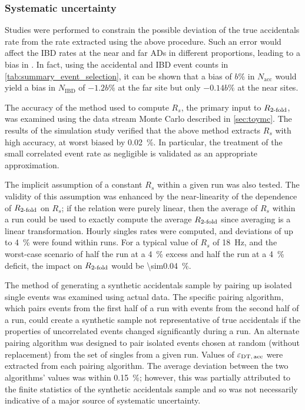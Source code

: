 \subsubsection{Systematic uncertainty}

Studies were performed to constrain the possible deviation
of the true accidentals rate
from the rate extracted using the above procedure.
Such an error would affect the IBD rates at the near and far ADs in different proportions,
leading to a bias in \thetaot{}.
In fact, using the accidental and IBD event counts in \cref{tab:summary_event_selection},
it can be shown that a bias of $b\si{\percent}$ in $N_{\text{acc}}$
would yield a bias in $N_{\text{IBD}}$ of $-1.2b\si{\percent}$ at the far site
but only $-0.14b\si{\percent}$ at the near sites.

The accuracy of the method used to compute $R_{s}$,
the primary input to $R_{\text{\ensuremath{2}-fold}}$,
was examined using the data stream Monte Carlo described in \cref{sec:toymc}.
The results of the simulation study verified that
the above method extracts $R_s$ with high accuracy, at worst biased by \SI{0.02}{\percent}.
In particular, the treatment of the small correlated event rate as negligible
is validated as an appropriate approximation.

The implicit assumption of a constant $R_s$ within a given run was also tested.
The validity of this assumption was enhanced by the near-linearity of
the dependence of $R_{\text{\ensuremath{2}-fold}}$ on $R_s$;
if the relation were purely linear,
then the average of $R_s$ within a run could be used to exactly compute
the average $R_{\text{\ensuremath{2}-fold}}$ since averaging is a linear transformation.
Hourly singles rates were computed, and deviations of up to \SI{4}{\percent}
were found within runs.
For a typical value of $R_s$ of \SI{18}{\Hz},
and the worst-case scenario of half the run at a \SI{4}{\percent} excess
and half the run at a \SI{4}{\percent} deficit,
the impact on $R_{\text{\ensuremath{2}-fold}}$ would be \SI{\sim0.04}{\percent}.

The method of generating a synthetic accidentals sample
by pairing up isolated single events was examined using actual data.
The specific pairing algorithm, which pairs events from the first half of a run
with events from the second half of a run,
could create a synthetic sample not representative of true accidentals
if the properties of uncorrelated events changed significantly during a run.
An alternate pairing algorithm was designed to pair isolated events
chosen at random (without replacement) from the set of singles from a given run.
Values of $\varepsilon_{\text{DT,\,acc}}$ were extracted from each pairing algorithm.
The average deviation between the two algorithms' values was within \SI{0.15}{\percent};
however, this was partially attributed to the finite statistics
of the synthetic accidentals sample
and so was not necessarily indicative of a major source of systematic uncertainty.

